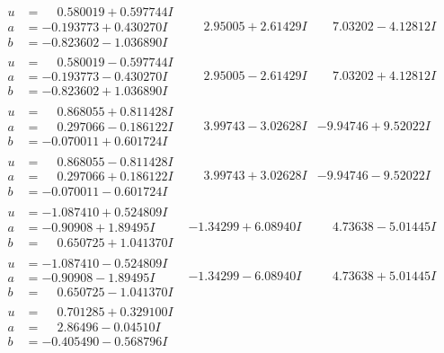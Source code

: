 \documentclass[1p]{elsarticle_modified}
\theoremstyle{definition}
\begin{document}
$$\begin{array}{c|c|c}
\begin{aligned}
u &= \phantom{-}0.580019 + 0.597744 I \\
a &= -0.193773 + 0.430270 I \\
b &= -0.823602 - 1.036890 I\end{aligned}
 & \phantom{-}2.95005 + 2.61429 I & \phantom{-}7.03202 - 4.12812 I \\ \hline\begin{aligned}
u &= \phantom{-}0.580019 - 0.597744 I \\
a &= -0.193773 - 0.430270 I \\
b &= -0.823602 + 1.036890 I\end{aligned}
 & \phantom{-}2.95005 - 2.61429 I & \phantom{-}7.03202 + 4.12812 I \\ \hline\begin{aligned}
u &= \phantom{-}0.868055 + 0.811428 I \\
a &= \phantom{-}0.297066 - 0.186122 I \\
b &= -0.070011 + 0.601724 I\end{aligned}
 & \phantom{-}3.99743 - 3.02628 I & -9.94746 + 9.52022 I \\ \hline\begin{aligned}
u &= \phantom{-}0.868055 - 0.811428 I \\
a &= \phantom{-}0.297066 + 0.186122 I \\
b &= -0.070011 - 0.601724 I\end{aligned}
 & \phantom{-}3.99743 + 3.02628 I & -9.94746 - 9.52022 I \\ \hline\begin{aligned}
u &= -1.087410 + 0.524809 I \\
a &= -0.90908 + 1.89495 I \\
b &= \phantom{-}0.650725 + 1.041370 I\end{aligned}
 & -1.34299 + 6.08940 I & \phantom{-}4.73638 - 5.01445 I \\ \hline\begin{aligned}
u &= -1.087410 - 0.524809 I \\
a &= -0.90908 - 1.89495 I \\
b &= \phantom{-}0.650725 - 1.041370 I\end{aligned}
 & -1.34299 - 6.08940 I & \phantom{-}4.73638 + 5.01445 I \\ \hline\begin{aligned}
u &= \phantom{-}0.701285 + 0.329100 I \\
a &= \phantom{-}2.86496 - 0.04510 I \\
b &= -0.405490 - 0.568796 I\end{aligned}

\end{array}$$
\end{document}
